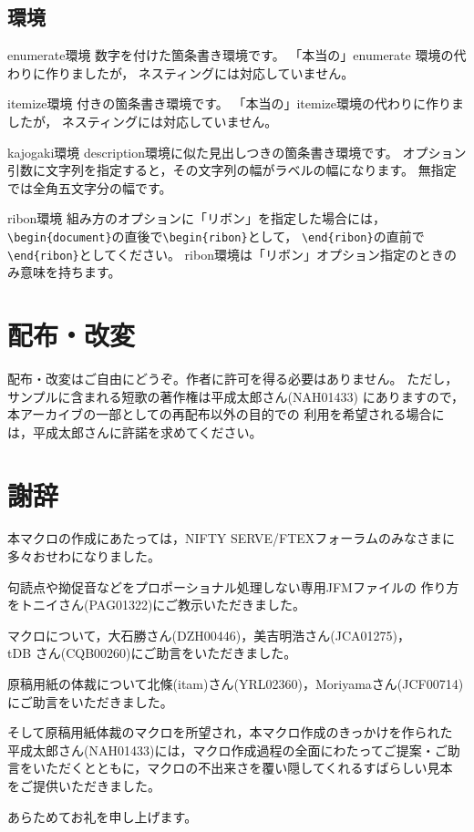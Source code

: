 \documentclass{jarticle}
\begin{document}
\subsection{環境}

\begin{kajogaki}[　　　　　　　　]
    \item[enumerate環境]数字を付けた箇条書き環境です。
    「本当の」enumerate 環境の代わりに作りましたが，
    ネスティングには対応していません。
    \item[itemize環境]\makebox[1zw][c]{\textbullet}付きの箇条書き環境です。
    「本当の」itemize環境の代わりに作りましたが，
    ネスティングには対応していません。
    \item[kajogaki環境]description環境に似た見出しつきの箇条書き環境です。
    オプション引数に文字列を指定すると，その文字列の幅がラベルの幅になります。
    無指定では全角五文字分の幅です。
    \item[ribon環境]組み方のオプションに「リボン」を指定した場合には，
    \verb+\begin{document}+の直後で\verb+\begin{ribon}+として，
    \verb+\end{ribon}+の直前で\verb+\end{ribon}+としてください。
    ribon環境は「リボン」オプション指定のときのみ意味を持ちます。
\end{kajogaki}

\section{配布・改変}
配布・改変はご自由にどうぞ。作者に許可を得る必要はありません。
ただし，サンプルに含まれる短歌の著作権は平成太郎さん(NAH01433)
にありますので，本アーカイブの一部としての再配布以外の目的での
利用を希望される場合には，平成太郎さんに許諾を求めてください。

\section{謝辞}

本マクロの作成にあたっては，NIFTY SERVE/FTEXフォーラムのみなさまに
多々おせわになりました。

句読点や拗促音などをプロポーショナル処理しない専用JFMファイルの
作り方をトニイさん(PAG01322)にご教示いただきました。

マクロについて，大石勝さん(DZH00446)，美吉明浩さん(JCA01275)，\\
tDB さん(CQB00260)にご助言をいただきました。

原稿用紙の体裁について北條(itam)さん(YRL02360)，Moriyamaさん(JCF00714)
にご助言をいただきました。

そして原稿用紙体裁のマクロを所望され，本マクロ作成のきっかけを作られた
平成太郎さん(NAH01433)には，マクロ作成過程の全面にわたってご提案・ご助
言をいただくとともに，マクロの不出来さを覆い隠してくれるすばらしい見本
をご提供いただきました。

あらためてお礼を申し上げます。

\vskip10mm

\end{document}
